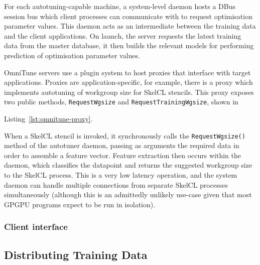 For each autotuning-capable machine, a system-level daemon hosts a
DBus session bus which client processes can communicate with to
request optimisation parameter values. This daemon acts as an
intermediate between the training data and the client applications. On
launch, the server requests the latest training data from the master
database, it then builds the relevant models for performing prediction
of optimisation parameter values.

OmniTune servers use a plugin system to host proxies that interface
with target applications. Proxies are application-specific, for
example, there is a proxy which implements autotuning of workgroup
size for SkelCL stencils. This proxy exposes two public methods,
\texttt{RequestWgsize} and \texttt{RequestTrainingWgsize}, shown in

Listing~\ref{lst:omnitune-proxy}.


When a SkelCL stencil is invoked, it synchronously calls the
\texttt{RequestWgsize()} method of the autotuner daemon, passing as
arguments the required data in order to assemble a feature
vector. Feature extraction then occurs within the daemon, which
classifies the datapoint and returns the suggested workgroup size to
the SkelCL process. This is a very low latency operation, and the
system daemon can handle multiple connections from separate SkelCL
processes simultaneously (although this is an admittedly unlikely
use-case given that most GPGPU programs expect to be run in
isolation).

\subsubsection{Client interface}






\subsection{Distributing Training Data}


